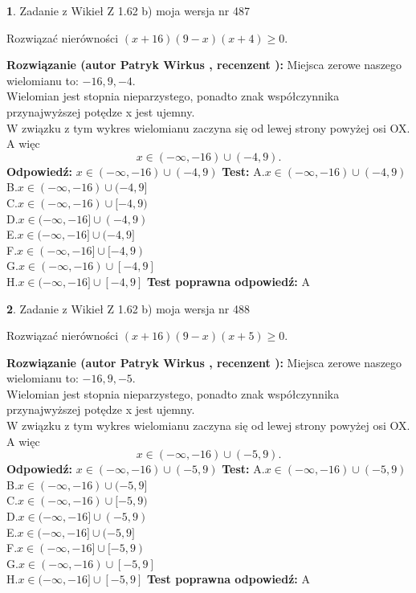 \documentclass[12pt, a4paper]{article}
\theoremstyle{definition} %
\newtheorem{zad}{}
\newcommand{\zadStart}[1]{\begin{zad}#1\newline}
\newcommand{\zadStop}{\end{zad}}
\newcommand{\rozwStart}[2]{\noindent \textbf{Rozwiązanie (autor #1 , recenzent #2): }\newline}
\newcommand{\rozwStop}{\newline}
\newcommand{\odpStart}{\noindent \textbf{Odpowiedź:}\newline}
\newcommand{\odpStop}{\newline}
\newcommand{\testStart}{\noindent \textbf{Test:}\newline}
\newcommand{\testStop}{\newline}
\newcommand{\kluczStart}{\noindent \textbf{Test poprawna odpowiedź:}\newline}
\newcommand{\kluczStop}{\newline}
\begin{document}
\zadStart{Zadanie z Wikieł Z 1.62 b) moja wersja nr 487}

Rozwiązać nierówności $(x+16)(9-x)(x+4)\ge0$.
\zadStop
\rozwStart{Patryk Wirkus}{}
Miejsca zerowe naszego wielomianu to: $-16, 9, -4$.\\
Wielomian jest stopnia nieparzystego, ponadto znak współczynnika przy\linebreak najwyższej potędze x jest ujemny.\\ W związku z tym wykres wielomianu zaczyna się od lewej strony powyżej osi OX. A więc $$x \in (-\infty,-16) \cup (-4,9).$$
\rozwStop
\odpStart
$x \in (-\infty,-16) \cup (-4,9)$
\odpStop
\testStart
A.$x \in (-\infty,-16) \cup (-4,9)$\\
B.$x \in (-\infty,-16) \cup (-4,9]$\\
C.$x \in (-\infty,-16) \cup [-4,9)$\\
D.$x \in (-\infty,-16] \cup (-4,9)$\\
E.$x \in (-\infty,-16] \cup (-4,9]$\\
F.$x \in (-\infty,-16] \cup [-4,9)$\\
G.$x \in (-\infty,-16) \cup [-4,9]$\\
H.$x \in (-\infty,-16] \cup [-4,9]$
\testStop
\kluczStart
A
\kluczStop



\zadStart{Zadanie z Wikieł Z 1.62 b) moja wersja nr 488}

Rozwiązać nierówności $(x+16)(9-x)(x+5)\ge0$.
\zadStop
\rozwStart{Patryk Wirkus}{}
Miejsca zerowe naszego wielomianu to: $-16, 9, -5$.\\
Wielomian jest stopnia nieparzystego, ponadto znak współczynnika przy\linebreak najwyższej potędze x jest ujemny.\\ W związku z tym wykres wielomianu zaczyna się od lewej strony powyżej osi OX. A więc $$x \in (-\infty,-16) \cup (-5,9).$$
\rozwStop
\odpStart
$x \in (-\infty,-16) \cup (-5,9)$
\odpStop
\testStart
A.$x \in (-\infty,-16) \cup (-5,9)$\\
B.$x \in (-\infty,-16) \cup (-5,9]$\\
C.$x \in (-\infty,-16) \cup [-5,9)$\\
D.$x \in (-\infty,-16] \cup (-5,9)$\\
E.$x \in (-\infty,-16] \cup (-5,9]$\\
F.$x \in (-\infty,-16] \cup [-5,9)$\\
G.$x \in (-\infty,-16) \cup [-5,9]$\\
H.$x \in (-\infty,-16] \cup [-5,9]$
\testStop
\kluczStart
A
\kluczStop
\end{document}
